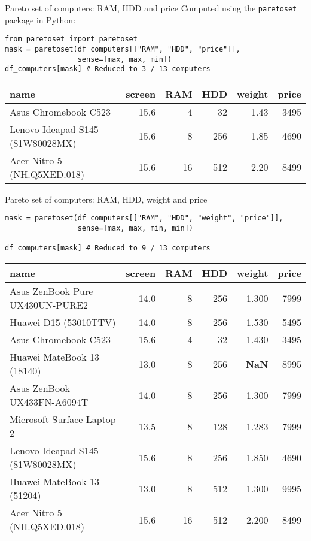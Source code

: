 \documentclass[11pt, aspectratio=149]{beamer}
\theoremstyle{plain}
\begin{document}
\begin{frame}[fragile, t]{Pareto set of computers: RAM, HDD and price}
Computed using the \texttt{paretoset} package in Python:
\vspace*{1em}
\begin{verbatim}
from paretoset import paretoset
mask = paretoset(df_computers[["RAM", "HDD", "price"]], 
                 sense=[max, max, min])
df_computers[mask] # Reduced to 3 / 13 computers
\end{verbatim}
\vspace*{1em}

\footnotesize 
\begin{tabular}{lrrrrr}
	\toprule
	name &  screen &  RAM &  HDD &  weight &  price \\
	\midrule
	Asus Chromebook C523 &    15.6 &    4 &   32 &    1.43 &   3495 \\
	Lenovo Ideapad S145 (81W80028MX) &    15.6 &    8 &  256 &    1.85 &   4690 \\
	Acer Nitro 5 (NH.Q5XED.018) &    15.6 &   16 &  512 &    2.20 &   8499 \\
	\bottomrule
\end{tabular}
\normalsize
\end{frame}


\begin{frame}[fragile, t]{Pareto set of computers: RAM, HDD, weight and price}
	\begin{verbatim}	
mask = paretoset(df_computers[["RAM", "HDD", "weight", "price"]], 
                 sense=[max, max, min, min])
	
df_computers[mask] # Reduced to 9 / 13 computers
\end{verbatim}
	\vspace*{1em}
	
	\footnotesize 
\begin{tabular}{lrrrrr}
	\toprule
	name &  screen &  RAM &  HDD &  weight &  price \\
	\midrule
	Asus ZenBook Pure UX430UN-PURE2 &    14.0 &    8 &  256 &   1.300 &   7999 \\
	Huawei D15 (53010TTV) &    14.0 &    8 &  256 &   1.530 &   5495 \\
	Asus Chromebook C523 &    15.6 &    4 &   32 &   1.430 &   3495 \\
	Huawei MateBook 13 (18140) &    13.0 &    8 &  256 &     \textbf{NaN} &   8995 \\
	Asus ZenBook UX433FN-A6094T &    14.0 &    8 &  256 &   1.300 &   7999 \\
	Microsoft Surface Laptop 2 &    13.5 &    8 &  128 &   1.283 &   7999 \\
	Lenovo Ideapad S145 (81W80028MX) &    15.6 &    8 &  256 &   1.850 &   4690 \\
	Huawei MateBook 13 (51204) &    13.0 &    8 &  512 &   1.300 &   9995 \\
	Acer Nitro 5 (NH.Q5XED.018) &    15.6 &   16 &  512 &   2.200 &   8499 \\
	\bottomrule
\end{tabular}


	\normalsize
\end{frame}
\end{document}

